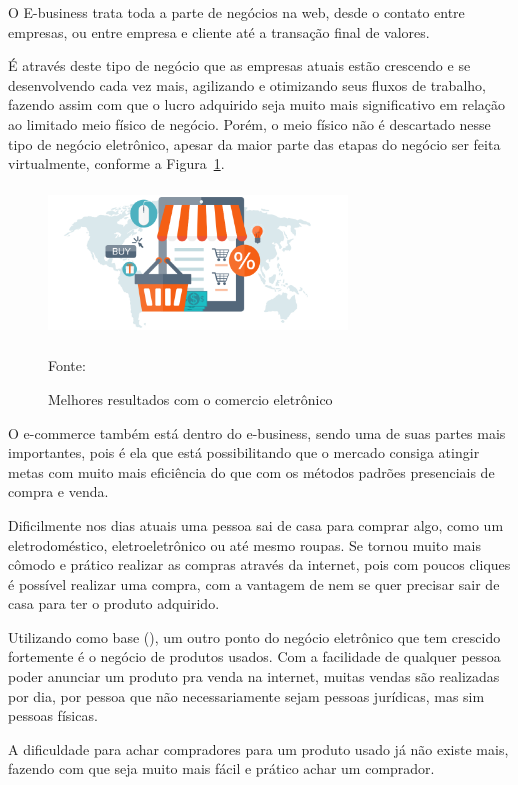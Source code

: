 O E-business trata toda a parte de negócios na web, desde o contato entre empresas, ou entre empresa e cliente até a transação final de valores.

É através deste tipo de negócio que as empresas atuais estão crescendo e se desenvolvendo cada vez mais, agilizando e otimizando seus fluxos de trabalho, fazendo assim com que o lucro adquirido seja muito mais significativo em relação ao limitado meio físico de negócio. Porém, o meio físico não é descartado nesse tipo de negócio eletrônico, apesar da maior parte das etapas do negócio ser feita virtualmente, conforme a Figura~\hypersetup{linkcolor=black}\ref{fig:Melhores}.

 \begin{figure}[!h]
	\centering
	\caption{Melhores resultados com o comercio eletrônico}
	\label{fig:Melhores}
	\includegraphics[width=300px, height=150px]{./images/2-6.png}
	\par{Fonte: \cite{3webbox}}
\end{figure}
\newpage
O e-commerce também está dentro do e-business, sendo uma de suas partes mais importantes, pois é ela que está possibilitando que o mercado consiga atingir metas com muito mais eficiência do que com os métodos padrões presenciais de compra e venda.

Dificilmente nos dias atuais uma pessoa sai de casa para comprar algo, como um eletrodoméstico, eletroeletrônico ou até mesmo roupas. Se tornou muito mais cômodo e prático realizar as compras através da internet, pois com poucos cliques é possível realizar uma compra, com a vantagem de nem se quer precisar sair de casa para ter o produto adquirido.

Utilizando como base (\cite{e-business}), um outro ponto do negócio eletrônico que tem crescido fortemente é o negócio de produtos usados. Com a facilidade de qualquer pessoa poder anunciar um produto pra venda na internet, muitas vendas são realizadas por dia, por pessoa que não necessariamente sejam pessoas jurídicas, mas sim pessoas físicas.

A dificuldade para achar compradores para um produto usado já não existe mais, fazendo com que seja muito mais fácil e prático achar um comprador.

